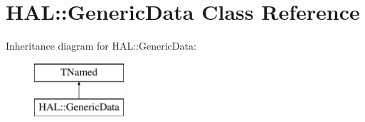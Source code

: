 \hypertarget{class_h_a_l_1_1_generic_data}{\section{H\-A\-L\-:\-:Generic\-Data Class Reference}
\label{class_h_a_l_1_1_generic_data}
}
Inheritance diagram for H\-A\-L\-:\-:Generic\-Data\-:\begin{figure}[H]
\begin{center}
\leavevmode
\includegraphics[height=2.000000cm]{class_h_a_l_1_1_generic_data}
\end{center}
\end{figure}
